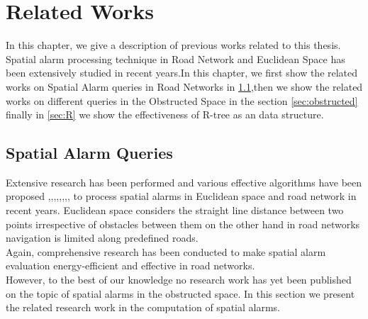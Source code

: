 \chapter{Related Works}
\label{chp:relworks}
In this chapter, we give a description of previous works related to this thesis. Spatial alarm processing technique in Road Network and Euclidean Space has been extensively studied in recent years.In this chapter, we first show the related works on Spatial Alarm queries in Road Networks in \ref{sec:spatialalarms},then we show the related works on different queries in the Obstructed Space in the section \ref{sec:obstructed} finally in \ref{sec:R} we show the effectiveness of R-tree as an data structure. \\
\vspace{15pt}

\section{Spatial Alarm Queries}
\label{sec:spatialalarms}
Extensive research has been performed and various  effective algorithms have been proposed \cite{roadalarm},\cite{mur},\cite{bamba},\cite{SA1},\cite{SA2},\cite{SA3},\cite{SA4},\cite{SA5},\cite{SA6} to process spatial alarms in Euclidean space and road network in recent years. Euclidean space considers the straight line distance between two points irrespective of obstacles between them on the other hand in road networks navigation is limited along predefined roads.\\ %
Again, comprehensive research \cite{liu} has been conducted to make spatial alarm evaluation energy-efficient and effective in road networks.\\ 
However, to the best of our knowledge no research work has yet been published on the topic of spatial alarms in the obstructed space.
In this section we present the related research work in the computation of spatial alarms.\\


